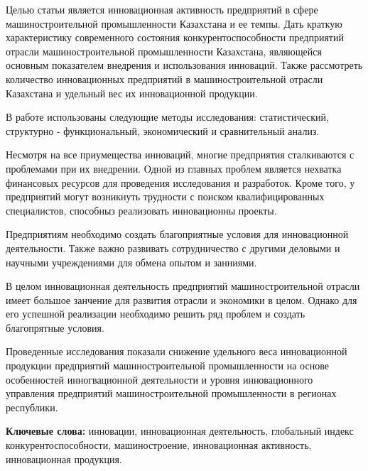 Целью статьи является инновационная активность предприятий в сфере
машиностроительной промышленности Казахстана и ее темпы. Дать краткую
характеристику современного состояния конкурентоспособности предприятий
отрасли машиностроительной промышленности Казахстана, являющейся
основным показателем внедрения и использования инноваций. Также
рассмотреть количество инновационных предприятий в машиностроительной
отрасли Казахстана и удельный вес их инновационной продукции.

В работе использованы следующие методы исследования: статистический,
структурно - функциональный, экономический и сравнительный анализ.

Несмотря на все приумещества инноваций, многие предприятия сталкиваются
с проблемами при их внедрении. Одной из главных проблем является
нехватка финансовых ресурсов для проведения исследования и разработок.
Кроме того, у предприятий могут возникнуть трудности с поиском
квалифицированных специалистов, способныз реализовать инновационны
проекты.

Предприятиям необходимо создать благоприятные условия для инновационной
деятельности. Также важно развивать сотрудничество с другими деловыми и
научными учреждениями для обмена опытом и занниями.

В целом инновационная деятельность предприятий машиностроительной
отрасли имеет большое занчение для развития отрасли и экономики в целом.
Однако для его успешной реализации необходимо решить ряд проблем и
создать благопрятные условия.

Проведенные исследования показали снижение удельного веса инновационной
продукции предприятий машиностроительной промышленности на основе
особенностей инногвационной деятельности и уровня инновационного
управления предприятий машиностроительной промышленности в регионах
республики.

{\bfseries Ключевые слова:} инновации, инновационная деятельность,
глобальный индекс конкурентоспособности, машиностроение, инновационная
активность, инновационная продукция.

